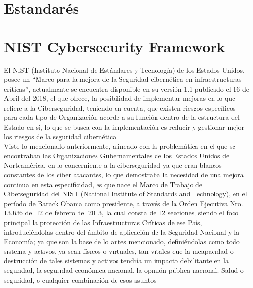 \documentclass[conference]{IEEEtran}
\begin{document}
\section{Estandarés}
\section{NIST Cybersecurity Framework}
El NIST (Instituto Nacional de Estándares y Tecnología) de los
Estados Unidos, posee un “Marco para la mejora de la Seguridad cibernética
en infraestructuras críticas”, actualmente se encuentra disponible en su
versión 1.1 publicado el 16 de Abril del 2018, el que ofrece, la posibilidad de
implementar mejoras en lo que refiere a la Ciberseguridad, teniendo en
cuenta, que existen riesgos específicos para cada tipo de Organización
acorde a su función dentro de la estructura del Estado en sí, lo que se busca
con la implementación es reducir y gestionar mejor los riesgos de la
seguridad cibernética.\\
Visto lo mencionado anteriormente, alineado con la problemática en el
que se encontraban las Organizaciones Gubernamentales de los Estados
Unidos de Norteamérica, en lo concerniente a la ciberseguridad ya que eran
blancos constantes de los ciber atacantes, lo que demostraba la necesidad
de una mejora continua en esta especificidad, es que nace el Marco de
Trabajo de Ciberseguridad del NIST (National Institute of Standards and
Technology), en el período de Barack Obama como presidente, a través de
la Orden Ejecutiva Nro. 13.636 del 12 de febrero del 2013, la cual consta de
12 secciones, siendo el foco principal la protección de las Infraestructuras
Críticas de ese País, introduciéndolas dentro del ámbito de aplicación de la
Seguridad Nacional y la Economía; ya que son la base de lo antes
mencionado, definiéndolas como todo sistema y activos, ya sean físicos o
virtuales, tan vitales que la incapacidad o destrucción de tales sistemas y
activos tendría un impacto debilitante en la seguridad, la seguridad
económica nacional, la opinión pública nacional. Salud o seguridad, o
cualquier combinación de esos asuntos
\end{document}
